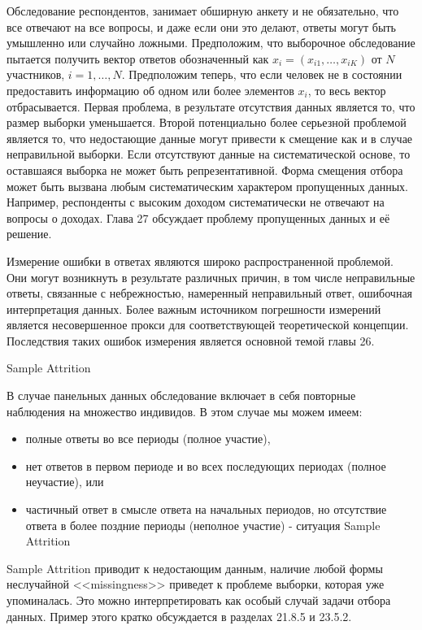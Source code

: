 Обследование респондентов, занимает обширную анкету и не обязательно, что все отвечают на все вопросы, и даже если они это делают, ответы могут быть умышленно или случайно ложными. Предположим, что выборочное обследование пытается получить вектор ответов обозначенный как $x_{i}=(x_{i1},\dots,x_{iK})$ от $N$ участников, $i= 1,\dots,N$. Предположим теперь, что если человек не в состоянии предоставить информацию об одном или более элементов $x_{i}$, то весь вектор отбрасывается. Первая проблема, в результате отсутствия данных является то, что размер выборки уменьшается. Второй потенциально более серьезной проблемой является то, что недостающие данные могут привести к смещение как и в случае неправильной выборки. Если отсутствуют данные на систематической основе, то оставшаяся выборка не может быть репрезентативной. Форма смещения отбора может быть вызвана любым систематическим характером пропущенных данных. Например, респонденты с высоким доходом систематически не отвечают на вопросы о доходах. Глава 27 обсуждает проблему пропущенных данных и её решение.


Измерение ошибки в ответах являются широко распространенной проблемой. Они могут возникнуть в результате различных причин, в том числе неправильные ответы, связанные с небрежностью, намеренный неправильный ответ, ошибочная интерпретация данных. Более важным источником погрешности измерений является несовершенное прокси для соответствующей теоретической концепции. Последствия таких ошибок измерения является основной темой главы 26.


\begin{center}
Sample Attrition
\end{center}

В случае панельных данных обследование включает в себя повторные наблюдения на множество индивидов. В этом случае мы можем имеем:

\begin{itemize}
\item полные ответы во все периоды (полное участие),
\item нет ответов в первом периоде и во всех последующих периодах (полное неучастие), или
\item частичный ответ в смысле ответа на начальных периодов, но отсутствие ответа в более поздние периоды (неполное участие) - ситуация Sample Attrition
\end{itemize}


Sample Attrition приводит к недостающим данным, наличие любой формы неслучайной <<missingness>> приведет к проблеме выборки, которая уже упоминалась. Это можно интерпретировать как особый случай задачи отбора данных. Пример этого кратко обсуждается в разделах 21.8.5 и 23.5.2.

